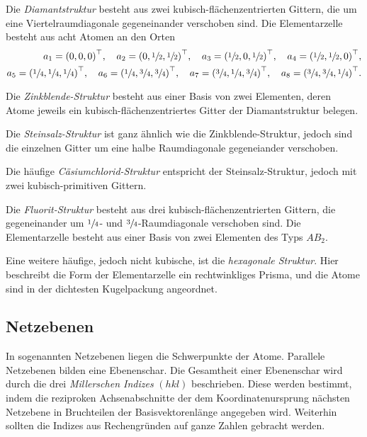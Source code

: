 Die \textit{Diamantstruktur} besteht aus zwei kubisch-flächenzentrierten Gittern,
die um eine Viertelraumdiagonale gegeneinander verschoben sind.
Die Elementarzelle besteht aus acht Atomen an den Orten
\begin{align*}
  a_1 = {\left(0, 0, 0\right)}^\top, \hspace{1em}
  a_2 = {\left(0, \sfrac{1}{2}, \sfrac{1}{2}\right)}^\top, \hspace{1em}
  a_3 = {\left(\sfrac{1}{2}, 0, \sfrac{1}{2}\right)}^\top, \hspace{1em}
  a_4 = {\left(\sfrac{1}{2}, \sfrac{1}{2}, 0\right)}^\top, \\
  a_5 = {\left(\sfrac{1}{4}, \sfrac{1}{4}, \sfrac{1}{4}\right)}^\top, \hspace{1em}
  a_6 = {\left(\sfrac{1}{4}, \sfrac{3}{4}, \sfrac{3}{4}\right)}^\top, \hspace{1em}
  a_7 = {\left(\sfrac{3}{4}, \sfrac{1}{4}, \sfrac{3}{4}\right)}^\top, \hspace{1em}
  a_8 = {\left(\sfrac{3}{4}, \sfrac{3}{4}, \sfrac{1}{4}\right)}^\top.
\end{align*}

Die \textit{Zinkblende-Struktur} besteht aus einer Basis von zwei Elementen,
deren Atome jeweils ein kubisch-flächenzentriertes Gitter
der Diamantstruktur belegen.

Die \textit{Steinsalz-Struktur} ist ganz ähnlich wie die Zinkblende-Struktur,
jedoch sind die einzelnen Gitter um eine halbe Raumdiagonale gegeneiander verschoben.

Die häufige \textit{Cäsiumchlorid-Struktur} entspricht der Steinsalz-Struktur,
jedoch mit zwei kubisch-primitiven Gittern.

Die \textit{Fluorit-Struktur} besteht aus drei kubisch-flächenzentrierten Gittern,
die gegeneinander um $\sfrac{1}{4}$- und $\sfrac{3}{4}$-Raumdiagonale verschoben sind.
Die Elementarzelle besteht aus einer Basis von zwei Elementen des Typs $AB_2$.

Eine weitere häufige, jedoch nicht kubische, ist die \textit{hexagonale Struktur}.
Hier beschreibt die Form der Elementarzelle ein rechtwinkliges Prisma,
und die Atome sind in der dichtesten Kugelpackung angeordnet.

\subsection{Netzebenen}
In sogenannten Netzebenen liegen die Schwerpunkte der Atome.
Parallele Netzebenen bilden eine Ebenenschar.
Die Gesamtheit einer Ebenenschar wird durch die drei
\textit{Millerschen Indizes} $\left(hkl\right)$ beschrieben.
Diese werden bestimmt, indem die reziproken Achsenabschnitte
der dem Koordinatenursprung nächsten Netzebene in Bruchteilen der
Basisvektorenlänge angegeben wird.
Weiterhin sollten die Indizes aus Rechengründen auf ganze Zahlen gebracht werden.

